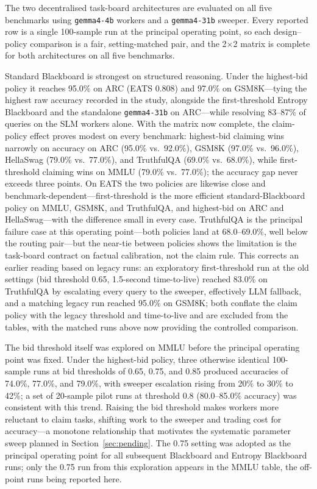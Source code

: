 The two decentralised task-board architectures are evaluated on all five benchmarks using \texttt{gemma4-4b} workers and a \texttt{gemma4-31b} sweeper. Every reported row is a single 100-sample run at the principal operating point, so each design--policy comparison is a fair, setting-matched pair, and the 2$\times$2 matrix is complete for both architectures on all five benchmarks.

Standard Blackboard is strongest on structured reasoning. Under the highest-bid policy it reaches 95.0\% on ARC (EATS 0.808) and 97.0\% on GSM8K---tying the highest raw accuracy recorded in the study, alongside the first-threshold Entropy Blackboard and the standalone \texttt{gemma4-31b} on ARC---while resolving 83--87\% of queries on the SLM workers alone. With the matrix now complete, the claim-policy effect proves modest on every benchmark: highest-bid claiming wins narrowly on accuracy on ARC (95.0\% vs.\ 92.0\%), GSM8K (97.0\% vs.\ 96.0\%), HellaSwag (79.0\% vs.\ 77.0\%), and TruthfulQA (69.0\% vs.\ 68.0\%), while first-threshold claiming wins on MMLU (79.0\% vs.\ 77.0\%); the accuracy gap never exceeds three points. On EATS the two policies are likewise close and benchmark-dependent---first-threshold is the more efficient standard-Blackboard policy on MMLU, GSM8K, and TruthfulQA, and highest-bid on ARC and HellaSwag---with the difference small in every case. TruthfulQA is the principal failure case at this operating point---both policies land at 68.0--69.0\%, well below the routing pair---but the near-tie between policies shows the limitation is the task-board contract on factual calibration, not the claim rule. This corrects an earlier reading based on legacy runs: an exploratory first-threshold run at the old settings (bid threshold 0.65, 1.5-second time-to-live) reached 83.0\% on TruthfulQA by escalating every query to the sweeper, effectively LLM fallback, and a matching legacy run reached 95.0\% on GSM8K; both conflate the claim policy with the legacy threshold and time-to-live and are excluded from the tables, with the matched runs above now providing the controlled comparison.

The bid threshold itself was explored on MMLU before the principal operating point was fixed. Under the highest-bid policy, three otherwise identical 100-sample runs at bid thresholds of 0.65, 0.75, and 0.85 produced accuracies of 74.0\%, 77.0\%, and 79.0\%, with sweeper escalation rising from 20\% to 30\% to 42\%; a set of 20-sample pilot runs at threshold 0.8 (80.0--85.0\% accuracy) was consistent with this trend. Raising the bid threshold makes workers more reluctant to claim tasks, shifting work to the sweeper and trading cost for accuracy---a monotone relationship that motivates the systematic parameter sweep planned in Section~\ref{sec:pending}. The 0.75 setting was adopted as the principal operating point for all subsequent Blackboard and Entropy Blackboard runs; only the 0.75 run from this exploration appears in the MMLU table, the off-point runs being reported here.

